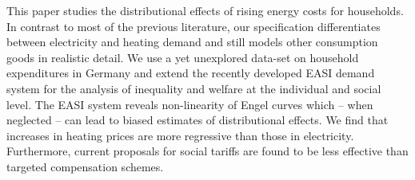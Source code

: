This paper studies the distributional effects of rising energy costs for households. In contrast to most of the previous literature, our specification differentiates between electricity and heating demand and still models other consumption goods in realistic detail. We use a yet unexplored data-set on household expenditures in Germany and extend the recently developed EASI demand system for the analysis of inequality and welfare at the individual and social level. The EASI system reveals non-linearity of Engel curves which – when neglected – can lead to biased estimates of distributional effects. We find that increases in heating prices are more regressive than those in electricity. Furthermore, current proposals for social tariffs are found to be less effective than targeted compensation schemes.
